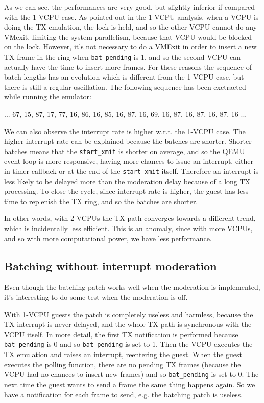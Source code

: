 As we can see, the performances are very good, but slightly inferior if compared with the 1-VCPU case.
As pointed out in the 1-VCPU analysis, when a VCPU is doing the TX emulation, the lock is held, and so the other VCPU cannot do any VMexit,
limiting the system parallelism, because that VCPU would be blocked on the lock. However, it's not necessary to do a VMExit in order to 
insert a new TX frame in the ring when \texttt{bat\_pending} is 1, and so the second VCPU can actually have the time to insert more
frames. For these reasons the sequence of batch lengths has an evolution which is different from the 1-VCPU case, but there is still  a 
regular oscillation. The following sequence has been exctracted while running the emulator:
\begin{center}
... 67, 15, 87, 17, 77, 16, 86, 16, 85, 16, 87, 16, 69, 16, 87, 16, 87, 16, 87, 16 ...
\end{center}
We can also observe the interrupt rate is higher w.r.t. the 1-VCPU case. The higher interrupt rate can be explained because the batches
are shorter. Shorter batches means that the \texttt{start\_xmit} is shorter on average, and so the QEMU event-loop is more responsive,
having more chances to issue an interrupt, either in timer callback or at the end of the \texttt{start\_xmit} itself. Therefore an
interrupt is less likely to be delayed more than the moderation delay because of a long TX processing.
To close the cycle, since interrupt rate is higher, the guest has less time to replenish the TX ring, and so the batches are shorter.

\vspace{0.5cm}

In other words, with 2 VCPUs the TX path converges towards a different trend, which is incidentally less efficient. This is an anomaly,
since with more VCPUs, and so with more computational power, we have less performance.



\subsection{Batching without interrupt moderation}
Even though the batching patch works well when the moderation is implemented, it's interesting to do some test when the moderation is off.

\vspace{0.5cm}

With 1-VCPU guests the patch is completely useless and harmless, because the TX interrupt is never delayed, and the whole TX path is
synchronous with the VCPU itself. In more detail, the first TX notification is performed because \texttt{bat\_pending} is 0 and so
\texttt{bat\_pending} is set to 1. Then the VCPU executes the TX emulation and raises an interrupt, reentering the guest. When
the guest executes the polling function, there are no pending TX frames (because the VCPU had no chances to insert new frames) and so
\texttt{bat\_pending} is set to 0. The next time the guest wants to send a frame the same thing happens again. So we have a notification
for each frame to send, e.g. the batching patch is useless.

